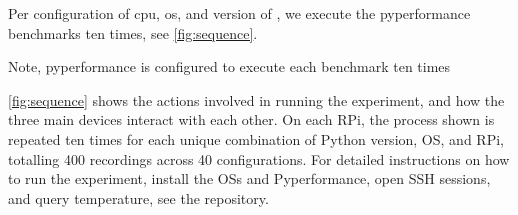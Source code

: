 Per configuration of \gls{cpu}, \gls{os}, and version of \python, we execute the \gls{pyperformance} benchmarks ten times, see \autoref{fig:sequence}.




Note, \gls{pyperformance} is configured to execute each benchmark ten times


\autoref{fig:sequence} shows the actions involved in running the experiment, and how the three main devices interact with each other.
On each RPi, the process shown is repeated ten times for each unique combination of Python version, OS, and RPi, totalling 400 recordings across 40 configurations.
For detailed instructions on how to run the experiment, install the OSs and Pyperformance, open SSH sessions, and query temperature, see the repository.
